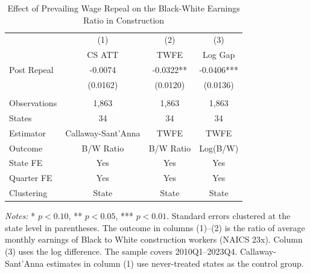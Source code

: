 \begin{table}[H]
\centering
\caption{Effect of Prevailing Wage Repeal on the Black-White Earnings Ratio in Construction}
\label{tab:main}
\begin{threeparttable}
\begin{tabular}{lccc}
\toprule
 & (1) & (2) & (3) \\
 & CS ATT & TWFE & Log Gap \\
\midrule
Post Repeal & -0.0074 & -0.0322** & -0.0406*** \\
 & (0.0162) & (0.0120) & (0.0136) \\
\\
Observations & 1,863 & 1,863 & 1,863 \\
States & 34 & 34 & 34 \\
Estimator & Callaway-Sant'Anna & TWFE & TWFE \\
Outcome & B/W Ratio & B/W Ratio & Log(B/W) \\
State FE & Yes & Yes & Yes \\
Quarter FE & Yes & Yes & Yes \\
Clustering & State & State & State \\
\bottomrule
\end{tabular}
\begin{tablenotes}[flushleft]
\small
\item \textit{Notes:} * $p<0.10$, ** $p<0.05$, *** $p<0.01$. Standard errors clustered at the state level in parentheses. The outcome in columns (1)--(2) is the ratio of average monthly earnings of Black to White construction workers (NAICS 23x). Column (3) uses the log difference. The sample covers 2010Q1--2023Q4. Callaway-Sant'Anna estimates in column (1) use never-treated states as the control group.
\end{tablenotes}
\end{threeparttable}
\end{table}
